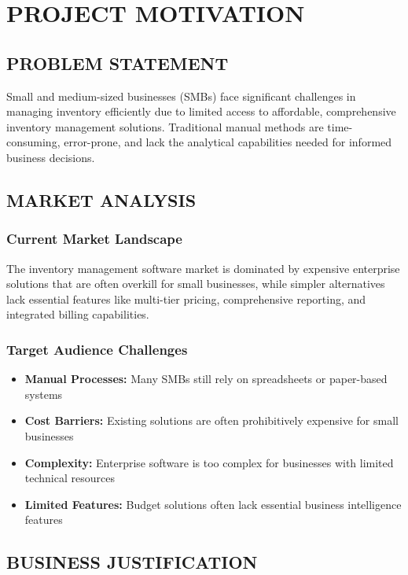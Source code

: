 \chapter{PROJECT MOTIVATION}

\section{PROBLEM STATEMENT}

Small and medium-sized businesses (SMBs) face significant challenges in managing inventory efficiently due to limited access to affordable, comprehensive inventory management solutions. Traditional manual methods are time-consuming, error-prone, and lack the analytical capabilities needed for informed business decisions.

\section{MARKET ANALYSIS}

\subsection{Current Market Landscape}
The inventory management software market is dominated by expensive enterprise solutions that are often overkill for small businesses, while simpler alternatives lack essential features like multi-tier pricing, comprehensive reporting, and integrated billing capabilities.

\subsection{Target Audience Challenges}
\begin{itemize}
\item \textbf{Manual Processes:} Many SMBs still rely on spreadsheets or paper-based systems
\item \textbf{Cost Barriers:} Existing solutions are often prohibitively expensive for small businesses
\item \textbf{Complexity:} Enterprise software is too complex for businesses with limited technical resources
\item \textbf{Limited Features:} Budget solutions often lack essential business intelligence features
\end{itemize}

\section{BUSINESS JUSTIFICATION}

